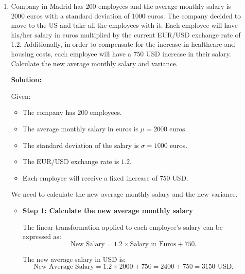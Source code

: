 \documentclass[12pt]{article}
\begin{document}
\begin{enumerate}
{\begin{enumerate}
The overall weighted mean is calculated as follows:
\[
\text{Weighted mean} = \frac{(27.5 \times 2) + (40.67 \times 3) + (51.2 \times 5)}{10}.
\]

Calculate the numerator:
\[
(27.5 \times 2) + (40.67 \times 3) + (51.2 \times 5) = 55 + 122.01 + 256 = 433.01.
\]

The weighted mean is:
\[
\frac{433.01}{10} = 43.3 \text{ thousand euros}.
\]

Thus, the overall average yearly income is \(43.3\) thousand euros.
\end{enumerate}


}

\item   Company in Madrid has 200 employees and the average monthly salary is 2000 euros with a standard deviation of 1000 euros. The company decided to move to the US and take all the employees with it. Each employee will have his/her salary in euros multiplied by the current EUR/USD exchange rate of 1.2. Additionally, in order to compensate for the increase in healthcare and housing costs, each employee will have a 750 USD increase in their salary. Calculate the new average monthly salary and variance. 

{\color{blue}
\noindent \textbf{Solution:}

Given:

\begin{itemize}
    \item The company has \( 200 \) employees.
    \item The average monthly salary in euros is \( \mu = 2000 \) euros.
    \item The standard deviation of the salary is \( \sigma = 1000 \) euros.
    \item The EUR/USD exchange rate is \( 1.2 \).
    \item Each employee will receive a fixed increase of \( 750 \) USD.
\end{itemize}

We need to calculate the new average monthly salary and the new variance.

\begin{itemize}
    \item \textbf{Step 1: Calculate the new average monthly salary}

    The linear transformation applied to each employee’s salary can be expressed as:
    \[
    \text{New Salary} = 1.2 \times \text{Salary in Euros} + 750.
    \]

    The new average salary in USD is:
    \[
    \text{New Average Salary} = 1.2 \times 2000 + 750 = 2400 + 750 = 3150 \text{ USD}.
    \]


\end{itemize}}
\end{enumerate}
\end{document}
